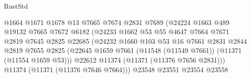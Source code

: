 \begin{lexlean}{RustStd}
\begin{coremodule}
                                        @1664
                                        @1671
                                        @1678
                                        @13
                                        @7665
                                        @7674
                                        @2831
                                        @7689
                                        (@24224
                                          @1663
                                          @489
                                          @19132
                                          @7665
                                          @7672
                                          @6182
                                          (@24233
                                            @1662
                                            @53
                                            @55
                                            @4647
                                            @7664
                                            @7671
                                            @2819
                                            @7645
                                            @2825
                                            @22685
                                            (@24232
                                              @1660
                                              @103
                                              @53
                                              @16
                                              @7661
                                              @2831
                                              @2844
                                              @2819
                                              @7655
                                              @2825
                                              (@22645
                                                @1659
                                                @7661
                                                (@11548 (@11549 @7661))
                                                (@11371 (@11554 @1659 @53)))
                                              @22612
                                              @11374
                                              (@11371 (@11376 @7656 @2831)))
                                            @11374
                                            (@11371 (@11376 @7646 @7664)))
                                          @23548
                                          @23551
                                          @23554
                                          @23558

\end{coremodule}
\end{lexlean}
